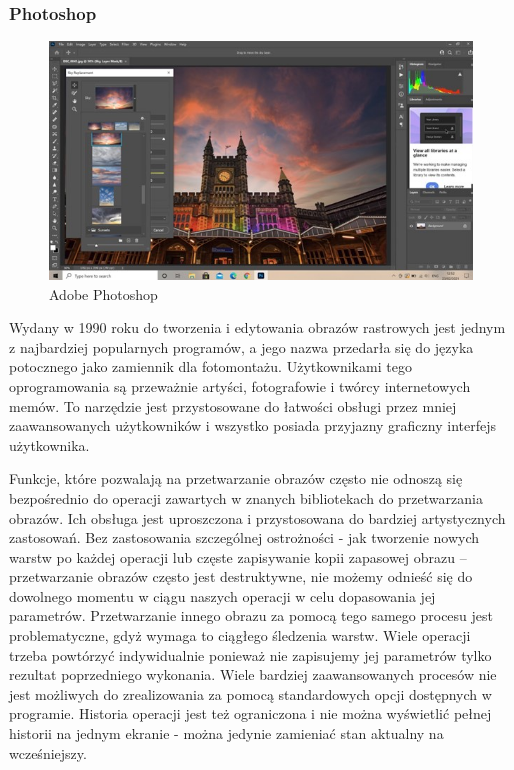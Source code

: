\subsubsection{Photoshop}
\begin{figure}[H]
    \centering
    \includegraphics{./images/Picture2.jpg}
    \caption{Adobe Photoshop}
    \label{fig:photoshop}
\end{figure}

Wydany w 1990 roku do tworzenia i edytowania obrazów rastrowych jest jednym z najbardziej popularnych programów, a jego nazwa przedarła się do języka potocznego jako zamiennik dla fotomontażu. 
Użytkownikami tego oprogramowania są przeważnie artyści, fotografowie i twórcy internetowych memów. 
To narzędzie jest przystosowane do łatwości obsługi przez mniej zaawansowanych użytkowników i wszystko posiada przyjazny graficzny interfejs użytkownika. 

Funkcje, które pozwalają na przetwarzanie obrazów często nie odnoszą się bezpośrednio do operacji zawartych w znanych bibliotekach do przetwarzania obrazów. 
Ich obsługa jest uproszczona i przystosowana do bardziej artystycznych zastosowań. 
Bez zastosowania szczególnej ostrożności - jak tworzenie nowych warstw po każdej operacji lub częste zapisywanie kopii zapasowej obrazu – przetwarzanie obrazów często jest destruktywne, nie możemy odnieść się do dowolnego momentu w ciągu naszych operacji w celu dopasowania jej parametrów. 
Przetwarzanie innego obrazu za pomocą tego samego procesu jest problematyczne, gdyż wymaga to ciągłego śledzenia warstw. Wiele operacji trzeba powtórzyć indywidualnie ponieważ nie zapisujemy jej parametrów tylko rezultat poprzedniego wykonania. Wiele bardziej zaawansowanych procesów nie jest możliwych do zrealizowania za pomocą standardowych opcji dostępnych w programie. Historia operacji jest też ograniczona i nie można wyświetlić pełnej historii na jednym ekranie - można jedynie zamieniać stan aktualny na wcześniejszy.

